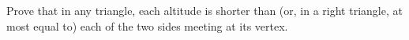 Prove that in any triangle, each altitude is shorter than (or, in a right triangle, at most equal to) each of the two sides meeting at its vertex.
